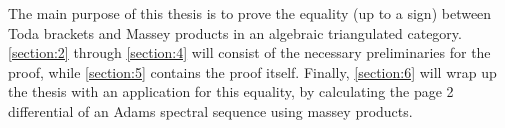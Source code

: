The main purpose of this thesis is to prove the equality (up to a sign) between Toda brackets and Massey products in an algebraic triangulated category. \autoref{section:2} through \autoref{section:4} will consist of the necessary preliminaries for the proof, while \autoref{section:5} contains the proof itself. Finally, \autoref{section:6} will wrap up the thesis with an application for this equality, by calculating the page 2 differential of an Adams spectral sequence using massey products.
